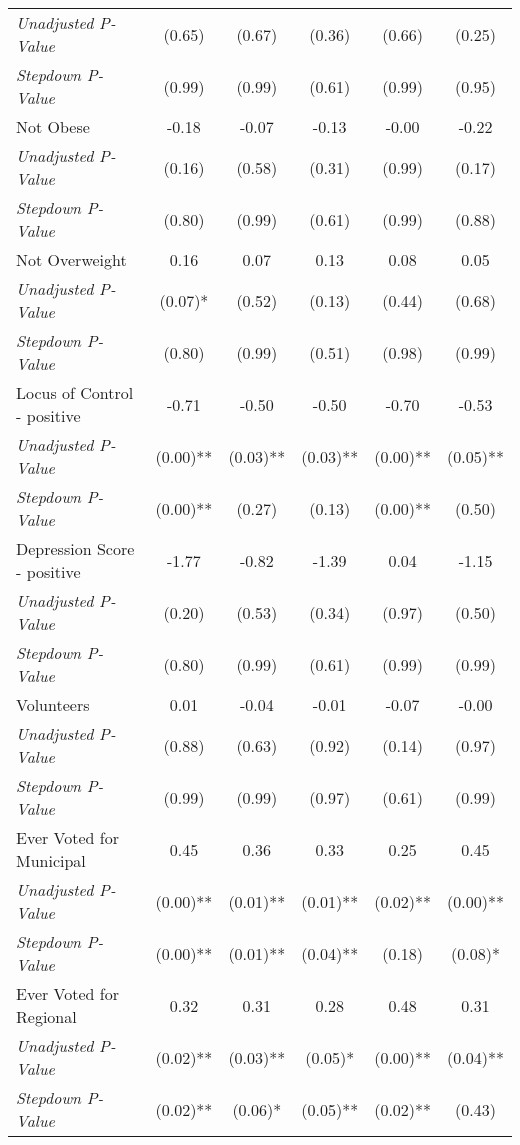 \begin{tabular}{l c c c c c}
\quad \textit{Unadjusted P-Value} & (0.65) & (0.67) & (0.36) & (0.66) & (0.25) \\
\quad \textit{Stepdown P-Value} & (0.99) & (0.99) & (0.61) & (0.99) & (0.95) \\
Not Obese & -0.18 & -0.07 & -0.13 & -0.00 & -0.22 \\
\quad \textit{Unadjusted P-Value} & (0.16) & (0.58) & (0.31) & (0.99) & (0.17) \\
\quad \textit{Stepdown P-Value} & (0.80) & (0.99) & (0.61) & (0.99) & (0.88) \\
Not Overweight & 0.16 & 0.07 & 0.13 & 0.08 & 0.05 \\
\quad \textit{Unadjusted P-Value} & (0.07)* & (0.52) & (0.13) & (0.44) & (0.68) \\
\quad \textit{Stepdown P-Value} & (0.80) & (0.99) & (0.51) & (0.98) & (0.99) \\
Locus of Control - positive & -0.71 & -0.50 & -0.50 & -0.70 & -0.53 \\
\quad \textit{Unadjusted P-Value} & (0.00)** & (0.03)** & (0.03)** & (0.00)** & (0.05)** \\
\quad \textit{Stepdown P-Value} & (0.00)** & (0.27) & (0.13) & (0.00)** & (0.50) \\
Depression Score - positive & -1.77 & -0.82 & -1.39 & 0.04 & -1.15 \\
\quad \textit{Unadjusted P-Value} & (0.20) & (0.53) & (0.34) & (0.97) & (0.50) \\
\quad \textit{Stepdown P-Value} & (0.80) & (0.99) & (0.61) & (0.99) & (0.99) \\
Volunteers & 0.01 & -0.04 & -0.01 & -0.07 & -0.00 \\
\quad \textit{Unadjusted P-Value} & (0.88) & (0.63) & (0.92) & (0.14) & (0.97) \\
\quad \textit{Stepdown P-Value} & (0.99) & (0.99) & (0.97) & (0.61) & (0.99) \\
Ever Voted for Municipal & 0.45 & 0.36 & 0.33 & 0.25 & 0.45 \\
\quad \textit{Unadjusted P-Value} & (0.00)** & (0.01)** & (0.01)** & (0.02)** & (0.00)** \\
\quad \textit{Stepdown P-Value} & (0.00)** & (0.01)** & (0.04)** & (0.18) & (0.08)* \\
Ever Voted for Regional & 0.32 & 0.31 & 0.28 & 0.48 & 0.31 \\
\quad \textit{Unadjusted P-Value} & (0.02)** & (0.03)** & (0.05)* & (0.00)** & (0.04)** \\
\quad \textit{Stepdown P-Value} & (0.02)** & (0.06)* & (0.05)** & (0.02)** & (0.43) \\

\end{tabular}
